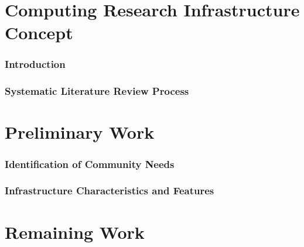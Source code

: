 

\part{Computing Research Infrastructure Concept}


\section{Introduction}
\label{sec:intro}


\section{Systematic Literature Review Process}
\label{sec:process}



\part{Preliminary Work}


\section{Identification of Community Needs}
\label{sec:prelim:needs}


\section{Infrastructure Characteristics and Features}
\label{sec:prelim:tools}



\part{Remaining Work}


